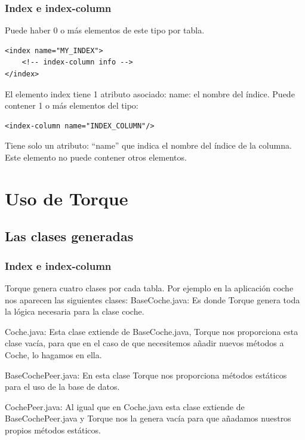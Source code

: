 \documentclass[24pt, a4paper, oneside, spanish]{beamer}
\begin{document}
			\begin{frame}
				\frametitle{Index e index-column}
				
				Puede haber 0 o más elementos de este tipo por tabla.

\begin{lstlisting}
<index name="MY_INDEX">
	<!-- index-column info -->
</index>
\end{lstlisting}

El elemento index tiene 1 atributo asociado:
name: el nombre del índice. 
Puede contener 1 o más elementos  del tipo:

\begin{lstlisting}
<index-column name="INDEX_COLUMN"/>
\end{lstlisting}

Tiene solo un atributo: “name” que indica el nombre del índice de la columna. Este elemento no puede contener otros elementos.
			\end{frame}	
			
\section{Uso de Torque}
	\subsection{Las clases generadas}
	\begin{frame}
	\frametitle{Index e index-column}
	Torque genera cuatro clases por cada tabla. Por ejemplo en la aplicación coche nos aparecen las siguientes clases:
BaseCoche.java: Es donde Torque genera toda la lógica necesaria para la clase coche.

Coche.java: Esta clase extiende de BaseCoche.java, Torque nos proporciona esta clase vacía, para que en el caso de que necesitemos añadir nuevos métodos a Coche, lo hagamos en ella.

BaseCochePeer.java: En esta clase Torque nos proporciona métodos estáticos para el uso de la base de datos.

CochePeer.java: Al igual que en Coche.java esta clase extiende de BaseCochePeer.java y Torque nos la genera vacía para que añadamos nuestros propios métodos estáticos.
	\end{frame}		
	
\end{document}
